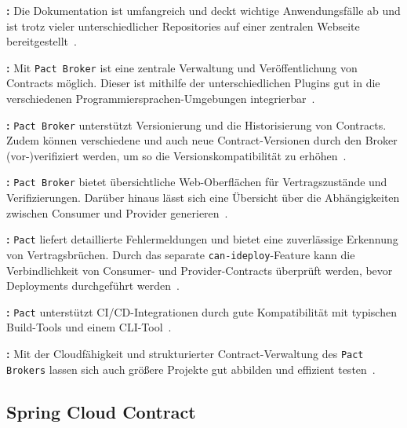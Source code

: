 \textbf{:} Die Dokumentation ist umfangreich und deckt wichtige Anwendungsfälle ab und ist trotz vieler unterschiedlicher Repositories auf einer zentralen Webseite bereitgestellt~\cite{pactfoundationPactDocs2022}.

\textbf{:} Mit \texttt{Pact Broker} ist eine zentrale Verwaltung und Veröffentlichung von Contracts möglich.
Dieser ist mithilfe der unterschiedlichen Plugins gut in die verschiedenen Programmiersprachen-Umgebungen integrierbar~\cite{pactfoundationPactDocs2022}.

\textbf{:} \texttt{Pact Broker} unterstützt Versionierung und die Historisierung von Contracts.
Zudem können verschiedene und auch neue Contract-Versionen durch den Broker (vor-)verifiziert werden, um so die Versionskompatibilität zu erhöhen~\cite{pactfoundationPactDocs2022}.

\textbf{:} \texttt{Pact Broker} bietet übersichtliche Web-Oberflächen für Vertragszustände und Verifizierungen.
Darüber hinaus lässt sich eine Übersicht über die Abhängigkeiten zwischen Consumer und Provider generieren~\cite{pactfoundationPactDocs2022}.

\textbf{:} \texttt{Pact} liefert detaillierte Fehlermeldungen und bietet eine zuverlässige Erkennung von Vertragsbrüchen.
Durch das separate \texttt{can-i\-deploy}-Feature kann die Verbindlichkeit von Consumer- und Provider-Contracts überprüft werden, bevor \glspl{Deployment} durchgeführt werden~\cite{pactfoundationPactDocs2022}.

\textbf{:} \texttt{Pact} unterstützt \gls{CI}/\gls{CD}-Integrationen durch gute Kompatibilität mit typischen \gls{Build}-Tools und einem \gls{CLI}-Tool~\cite{pactfoundationPactDocs2022}.

\textbf{:} Mit der Cloudfähigkeit und strukturierter Contract-Verwaltung des \texttt{Pact Brokers} lassen sich auch größere Projekte gut abbilden und effizient testen~\cite{pactfoundationPactDocs2022}.


\subsection*{Spring Cloud Contract}

